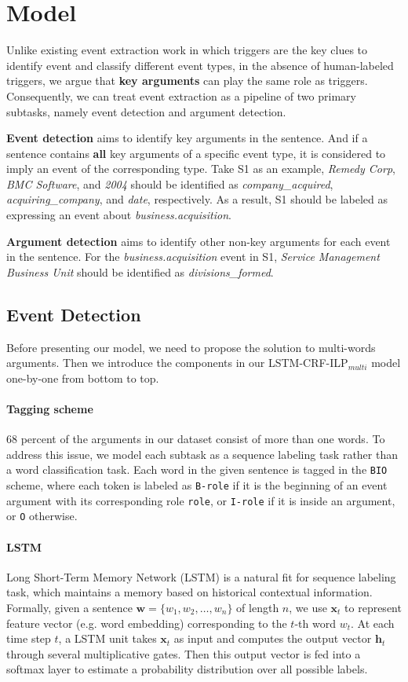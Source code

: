 \section{Model}
Unlike existing event extraction work in which triggers are the key clues to identify event and classify different event types, in the absence of human-labeled triggers, we argue that \textbf{key arguments} can play the same role as triggers. Consequently, we can treat event extraction as a pipeline of two primary subtasks, namely event detection and argument detection. 

\textbf{Event detection} aims to identify key arguments in the sentence. And if a sentence contains \textbf{all} key arguments of a specific event type, it is considered to imply an event of the corresponding type. Take S1 as an example, \emph{Remedy Corp}, \emph{BMC Software}, and \emph{2004} should be identified as \emph{company\_acquired}, \emph{acquiring\_company}, and \emph{date}, respectively. As a result, S1 should be labeled as expressing an event about \emph{business.acquisition}. 

\textbf{Argument detection} aims to identify other non-key arguments for each event in the sentence. For the \emph{business.acquisition} event in S1, \emph{Service Management Business Unit} should be identified as \emph{divisions\_formed}.

\subsection{Event Detection \label{evede}}
Before presenting our model, we need to propose the solution to multi-words arguments. Then we introduce the components in our LSTM-CRF-ILP$_{multi}$ model one-by-one from bottom to top.

\paragraph{Tagging scheme}
68 percent of the arguments in our dataset consist of more than one words. To address this issue, we model each subtask as a sequence labeling task rather than a word classification task. Each word in the given sentence is tagged in the \texttt{BIO} scheme, where each token is labeled as \texttt{B-role} if it is the beginning of an event argument with its corresponding role \texttt{role}, or \texttt{I-role} if it is inside an argument, or \texttt{O} otherwise. 

\paragraph{LSTM}
Long Short-Term Memory Network (LSTM) \cite{hochreiter1997long} is a natural fit for sequence labeling task, which maintains a memory based on historical contextual information. Formally, given a sentence $\bm{w} = \{w_1, w_2, \dots, w_n\}$ of length $n$, we use $\textbf{x}_t$ to represent feature vector (e.g. word embedding) corresponding to the $t$-th word $w_t$. At each time step $t$, a LSTM unit takes $\textbf{x}_t$ as input and computes the output vector $\textbf{h}_t$ through several multiplicative gates. Then this output vector is fed into a softmax layer to estimate a probability distribution over all possible labels.

